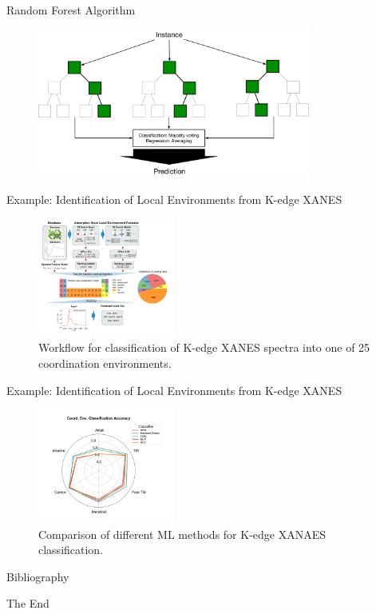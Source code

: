 \documentclass[aspectratio=169]{beamer}
\begin{document}
\begin{frame}{Random Forest Algorithm}
\begin{figure}
    \centering
    \includegraphics[width=0.8\textwidth]{figures/randomforestalgo.pdf}
\end{figure}
\end{frame}



\begin{frame}{Example: Identification of Local Environments from K-edge XANES}
\begin{figure}
    \centering
    \includegraphics[width=0.4\textwidth]{figures/randomforestxanes.pdf}
    \caption{Workflow for classification of K-edge XANES spectra into one of 25 coordination environments.\cite{zhengRandomForestModels2019}}
\end{figure}
\end{frame}


\begin{frame}{Example: Identification of Local Environments from K-edge XANES}
\begin{figure}
    \centering
    \includegraphics[width=0.4\textwidth]{figures/coord_env_class_acc_radar.pdf}
    \caption{Comparison of different ML methods for K-edge XANAES classification.\cite{zhengRandomForestModels2019}}
\end{figure}
\end{frame}


\begin{frame}{Bibliography}
    
    
\end{frame}




\begin{frame}
    \Huge{\centerline{The End}}
\end{frame}
\end{document}
